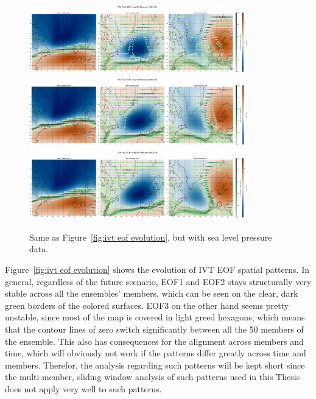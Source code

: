 \begin{figure}[htb]
  \begin{center}
    \includegraphics[width=0.85\textwidth]{figures/psl_spat_patterns_hexbin_18501899_ssp585_50seasons.png}
    \includegraphics[width=0.85\textwidth]{figures/psl_spat_patterns_hexbin_20502100_ssp126_50seasons.png}
    \includegraphics[width=0.85\textwidth]{figures/psl_spat_patterns_hexbin_20502100_ssp585_50seasons.png}
  \end{center}
  \caption{Same as Figure~\ref{fig:ivt eof evolution}, but with sea level pressure data.}\label{fig:psl eof evolution}
\end{figure}




Figure~\ref{fig:ivt eof evolution} shows the evolution of IVT EOF spatial patterns. 
In general, regardless of the future scenario, EOF1 and EOF2 stays structurally very stable across all the ensembles' members, which can be seen on the clear, dark green borders of the colored surfaces. 
EOF3 on the other hand seems pretty unstable, since most of the map is covered in light greed hexagons, which means that the contour lines of zero switch significantly between all the 50 members of the ensemble. 
This also has consequences for the alignment across members and time, which will obviously not work if the patterns differ greatly across time and members. 
Therefor, the analysis regarding such patterns will be kept short since the multi-member, sliding window analysis of such patterns used in this Thesis does not apply very well to such patterns. 


